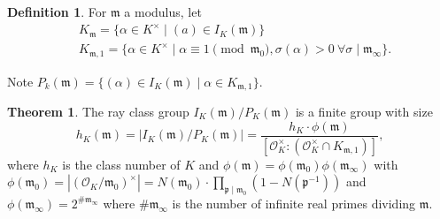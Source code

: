 \documentclass{article}
\theoremstyle{definition}
\newtheorem{theorem}{Theorem}[section]
\newtheorem{defn}{Definition}[section]
\begin{document}

\begin{defn}
    For $\mathfrak{m}$ a modulus, let 
    \begin{align*}
        &K_{\mathfrak{m}} = \{\alpha \in K^\times \mid (a) \in I_K(\mathfrak{m})\}\\
        &K_{\mathfrak{m},1} = \{\alpha \in K^\times \mid  \alpha \equiv 1 \pmod{\mathfrak{m}_0}, \sigma(\alpha)>0 ~\forall \sigma \mid \mathfrak{m}_\infty\}.
    \end{align*}
\end{defn}
Note $P_k(\mathfrak{m}) = \{(\alpha) \in I_K(\mathfrak{m}) \mid  \alpha \in K_{\mathfrak{m},1}\}$.

\begin{theorem}
    The ray class group $I_K(\mathfrak{m})/P_K(\mathfrak{m})$ is a finite group with size \[
    h_K(\mathfrak{m}) = |I_K(\mathfrak{m})/P_K(\mathfrak{m})| = \frac{h_K \cdot \phi(\mathfrak{m})}{[\mathcal{O}_K^\times : (\mathcal{O}_K^\times \cap K_{\mathfrak{m},1})]},
    \]
    where $h_K$ is the class number of $K$ and $\phi(\mathfrak{m}) = \phi(\mathfrak{m}_0)\phi(\mathfrak{m}_{\infty})$ with $\phi(\mathfrak{m}_0) = |(\mathcal{O}_K/\mathfrak{m}_0)^\times| = N(\mathfrak{m}_0) \cdot \prod_{\mathfrak{p} \mid \mathfrak{m}_0}^{} (1-N(\mathfrak{p}^{-1}))$ and $\phi(\mathfrak{m}_{\infty}) = 2^{\# \mathfrak{m}_{\infty}}$ where $\# \mathfrak{m}_{\infty}$ is the number of infinite real primes dividing $\mathfrak{m}$.
\end{theorem}
\end{document}
